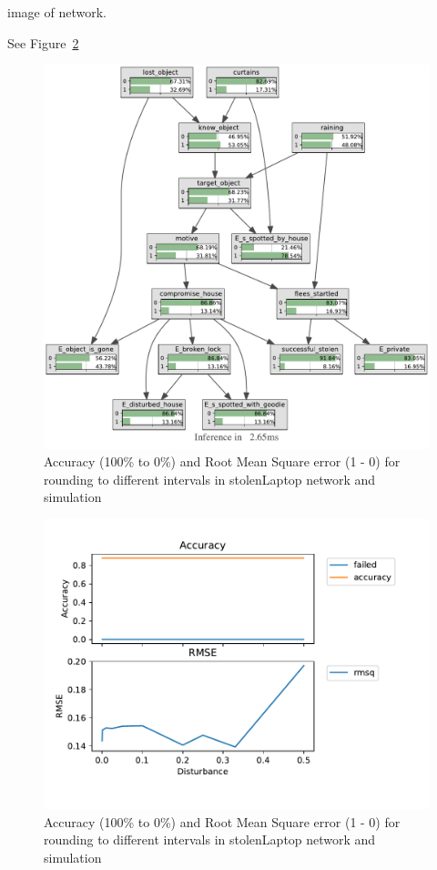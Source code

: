image of network.

See Figure~\ref{laptopAcc}
\begin{figure}[h!]
\begin{center}
\includegraphics[]{../experiments/StolenLaptop/bnImage/BNIMAGEStolenLaptop.pdf}
\caption{Accuracy (100\% to 0\%) and Root Mean Square error (1 - 0) for rounding to different intervals in stolenLaptop network and simulation}
\label{laptopAcc}
\end{center}
\end{figure}


\begin{figure}[h!]
\begin{center}
\includegraphics[]{../experiments/StolenLaptop/plots/performance_StolenLaptop.pdf}
\caption{Accuracy (100\% to 0\%) and Root Mean Square error (1 - 0) for rounding to different intervals in stolenLaptop network and simulation}
\label{laptopAcc}
\end{center}
\end{figure}


